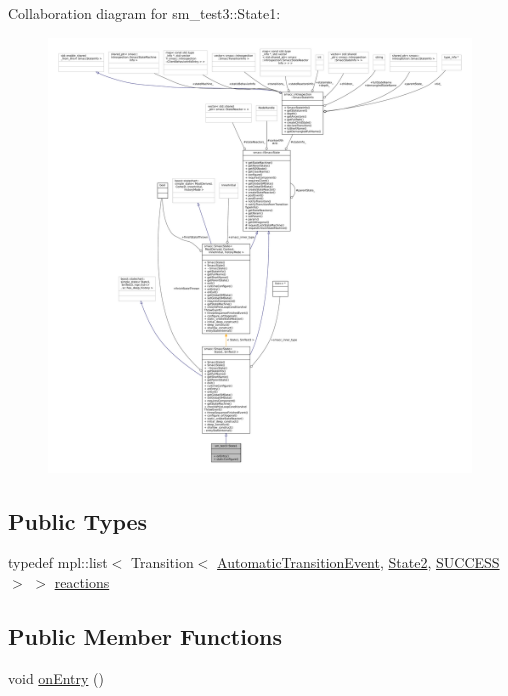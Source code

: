 Collaboration diagram for sm\+\_\+test3\+:\+:State1\+:
\nopagebreak
\begin{figure}[H]
\begin{center}
\leavevmode
\includegraphics[width=350pt]{structsm__test3_1_1State1__coll__graph}
\end{center}
\end{figure}
\subsection*{Public Types}
\begin{DoxyCompactItemize}
\item 
typedef mpl\+::list$<$ Transition$<$ \hyperlink{structsm__test3_1_1AutomaticTransitionEvent}{Automatic\+Transition\+Event}, \hyperlink{structsm__test3_1_1State2}{State2}, \hyperlink{classSUCCESS}{S\+U\+C\+C\+E\+SS} $>$ $>$ \hyperlink{structsm__test3_1_1State1_af03c994bf71ae8540145a45d59aa4400}{reactions}
\end{DoxyCompactItemize}
\subsection*{Public Member Functions}
\begin{DoxyCompactItemize}
\item 
void \hyperlink{structsm__test3_1_1State1_adffc862b4ed826bb2807e921638e2d4a}{on\+Entry} ()
\end{DoxyCompactItemize}
